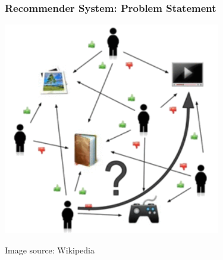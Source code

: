 \documentclass[11pt,aspectratio=169]{beamer}
\begin{document}
	\begin{frame}
		\frametitle{Recommender System: Problem Statement}
		\begin{center}
			\centering
			\includegraphics[height=0.7\textheight]{images/cf-stage1.png}
			
			{\tiny Image source: Wikipedia}
		\end{center}
	\end{frame}
	
\end{document}
